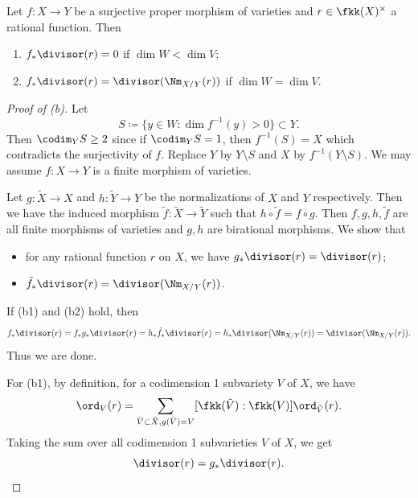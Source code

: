     \begin{proposition}\label{prop:pushforward_of_divisor_of_rational_funcitons}
        Let \(f: X \to Y\) be a surjective proper morphism of varieties and \(r \in \fkk(X)^{\times}\) a rational function. 
        Then
        \begin{enumerate}
            \item \(f_*\divisor(r) = 0\) if \(\dim W < \dim V\);
            \item \(f_*\divisor(r) = \divisor(\Nm_{X/Y}(r))\) if \(\dim W = \dim V\).
        \end{enumerate}
    \end{proposition}
    \begin{proof}[Proof of (b)]
        Let 
        \[ S \coloneqq \{y \in W: \dim f^{-1}(y) > 0\} \subset Y.\]
        Then \(\codim_Y S \geq 2\) since if \(\codim_Y S = 1\), then \(f^{-1}(S) = X\) which contradicts the surjectivity of \(f\).
        Replace \(Y\) by \(Y \setminus S\) and \(X\) by \(f^{-1}(Y \setminus S)\). 
        We may assume \(f: X \to Y\) is a finite morphism of varieties.

        Let \(g:\tilde{X} \to X\) and \(h:\tilde{Y} \to Y\) be the normalizations of \(X\) and \(Y\) respectively. 
        Then we have the induced morphism \(\tilde{f}: \tilde{X} \to \tilde{Y}\) such that \(h \circ \tilde{f} = f \circ g\).
        Then \(f, g, h, \tilde{f}\) are all finite morphisms of varieties and \(g,h\) are birational morphisms.
        We show that 
        \begin{itemize}
            \item [(b1)] for any rational function \(r\) on \(X\), we have \(g_*\divisor(r) = \divisor(r)\);
            \item [(b2)] \(\tilde{f}_*\divisor(r) = \divisor(\Nm_{X/Y}(r))\).
        \end{itemize}
        If (b1) and (b2) hold, then
        \[ f_*\divisor(r) = f_* g_* \divisor(r) = h_* \tilde{f}_* \divisor(r) = h_* \divisor(\Nm_{X/Y}(r)) = \divisor(\Nm_{X/Y}(r)). \]
        Thus we are done.

        For (b1), by definition, for a codimension 1 subvariety \(V\) of \(X\), we have
        \[ \ord_V(r) = \sum_{\tilde{V} \subset \tilde{X}, g(\tilde{V}) = V} [\fkk(\tilde{V}):\fkk(V)] \ord_{\tilde{V}}(r). \]
        Taking the sum over all codimension 1 subvarieties \(V\) of \(X\), we get
        \[ \divisor(r) = g_*\divisor(r). \]


\end{proof}

